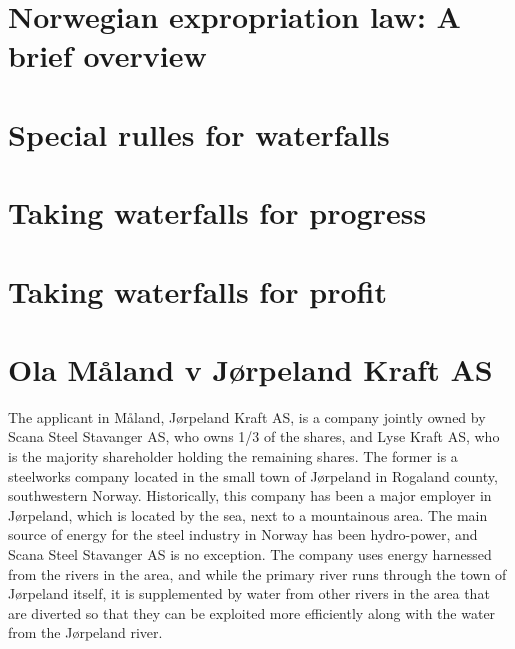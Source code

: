 \section{Norwegian expropriation law: A brief overview}

\section{Special rulles for waterfalls}

\section{Taking waterfalls for progress}

\section{Taking waterfalls for profit}

\section{Ola Måland v Jørpeland Kraft AS}


The applicant in Måland, Jørpeland Kraft AS, is a company jointly owned by Scana Steel Stavanger AS, who owns 1/3 of the shares, and Lyse Kraft AS, who is the majority shareholder holding the remaining shares. The former is a steelworks company located in the small town of Jørpeland in Rogaland county, southwestern Norway. Historically, this company has been a major employer in Jørpeland, which is located by the sea, next to a mountainous area. The main source of energy for the steel industry in Norway has been hydro-power, and Scana Steel Stavanger AS is no exception. The company uses energy harnessed from the rivers in the area, and while the primary river runs through the town of Jørpeland itself, it is supplemented by water from other rivers in the area that are diverted so that they can be exploited more efficiently along with the water from the Jørpeland river.

